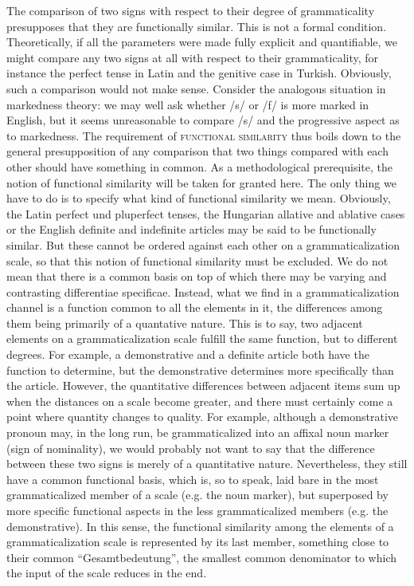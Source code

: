 \label{page135}The comparison of two signs with respect to their degree of grammaticality presupposes that they are functionally similar. This is not a formal condition. Theoretically, if all the parameters were made fully explicit and quantifiable, we might compare any two signs at all with respect to their grammaticality, for instance the perfect tense in Latin and the genitive case in Turkish. Obviously, such a comparison would not make sense. Consider the analogous situation in markedness theory: we may well ask whether /s/ or /f/ is more marked in English, but it seems unreasonable to compare /s/ and the progressive aspect as to markedness. The requirement of \textsc{functional similarity} thus boils down to the general presupposition of any comparison that two things compared with each other should have something in common. As a methodological prerequisite, the notion of functional similarity will be taken for granted here. The only thing we have to do is to specify what kind of functional similarity we mean. Obviously, the Latin perfect und pluperfect tenses, the Hungarian allative and ablative cases or the English definite and indefinite articles may be said to be functionally similar. But these cannot be ordered against each other on a grammaticalization scale, so that this notion of functional similarity must be excluded. We do not mean that there is a common basis on top of which there may be varying and contrasting differentiae specificae. Instead, what we find in a grammaticalization channel is a function common to all the elements in it, the differences among them being primarily of a quantative nature. This is to say, two adjacent elements on a grammaticalization scale fulfill the same function, but to different degrees. For example, a demonstrative and a definite article both have the function to determine, but the demonstrative determines more specifically than the article. However, the quantitative differences between adjacent items sum up when the distances on a scale become greater, and there must certainly come a point where quantity changes to quality. For example, although a demonstrative pronoun may, in the long run, be grammaticalized into an affixal noun marker (sign of nominality), we would probably not want to say that the difference between these two signs is merely of a quantitative nature. Nevertheless, they still have a common functional basis, which is, so to speak, laid bare in the most grammaticalized member of a scale (e.g. the noun marker), but superposed by more specific functional aspects in the less grammaticalized members (e.g. the demonstrative). In this sense, the functional similarity among the elements of a grammaticalization scale is represented by its last member, something close to their common ``Gesamtbedeutung'', the smallest common denominator to which the input of the scale reduces in the end.\label{page135b}

